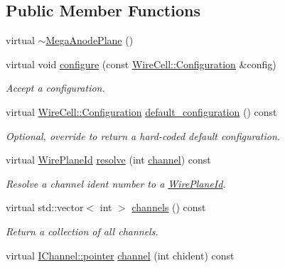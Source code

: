 \subsection*{Public Member Functions}
\begin{DoxyCompactItemize}
\item 
virtual \hyperlink{class_wire_cell_1_1_gen_1_1_mega_anode_plane_aa9912010c3155fa7e010faf6fe1f01d7}{$\sim$\+Mega\+Anode\+Plane} ()
\item 
virtual void \hyperlink{class_wire_cell_1_1_gen_1_1_mega_anode_plane_a68669a57b1f5baa35fdbcc259e230fb4}{configure} (const \hyperlink{namespace_wire_cell_a9f705541fc1d46c608b3d32c182333ee}{Wire\+Cell\+::\+Configuration} \&config)
\begin{DoxyCompactList}\small\item\em Accept a configuration. \end{DoxyCompactList}\item 
virtual \hyperlink{namespace_wire_cell_a9f705541fc1d46c608b3d32c182333ee}{Wire\+Cell\+::\+Configuration} \hyperlink{class_wire_cell_1_1_gen_1_1_mega_anode_plane_a46b1dc962d2894307fa820da9ea5f663}{default\+\_\+configuration} () const
\begin{DoxyCompactList}\small\item\em Optional, override to return a hard-\/coded default configuration. \end{DoxyCompactList}\item 
virtual \hyperlink{class_wire_cell_1_1_wire_plane_id}{Wire\+Plane\+Id} \hyperlink{class_wire_cell_1_1_gen_1_1_mega_anode_plane_a39f210db553e1e981412c2c44861870c}{resolve} (int \hyperlink{class_wire_cell_1_1_gen_1_1_mega_anode_plane_a3cc2a292c89472524f21379c0eff1111}{channel}) const
\begin{DoxyCompactList}\small\item\em Resolve a channel ident number to a \hyperlink{class_wire_cell_1_1_wire_plane_id}{Wire\+Plane\+Id}. \end{DoxyCompactList}\item 
virtual std\+::vector$<$ int $>$ \hyperlink{class_wire_cell_1_1_gen_1_1_mega_anode_plane_a1106718600e8a867efd62a7c9dedafd2}{channels} () const
\begin{DoxyCompactList}\small\item\em Return a collection of all channels. \end{DoxyCompactList}\item 
virtual \hyperlink{class_wire_cell_1_1_i_data_aff870b3ae8333cf9265941eef62498bc}{I\+Channel\+::pointer} \hyperlink{class_wire_cell_1_1_gen_1_1_mega_anode_plane_a3cc2a292c89472524f21379c0eff1111}{channel} (int chident) const

\end{DoxyCompactItemize}
